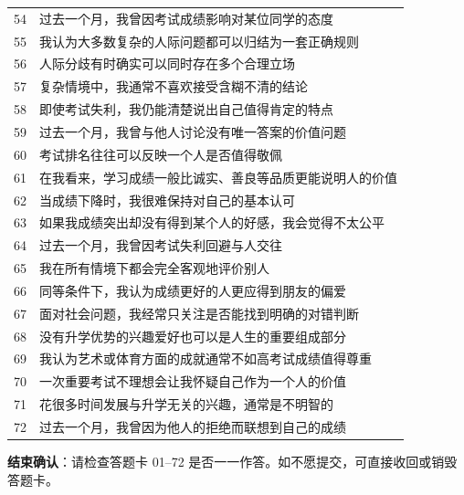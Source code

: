 \documentclass[11pt,a4paper,UTF8,fontset=none]{ctexart}
\begin{document}
\begin{longtable}{@{}p{1.2cm}p{14.5cm}@{}}
54&过去一个月，我曾因考试成绩影响对某位同学的态度\\[3pt]
55&我认为大多数复杂的人际问题都可以归结为一套正确规则\\[3pt]
56&人际分歧有时确实可以同时存在多个合理立场\\[3pt]
57&复杂情境中，我通常不喜欢接受含糊不清的结论\\[3pt]
58&即使考试失利，我仍能清楚说出自己值得肯定的特点\\[3pt]
59&过去一个月，我曾与他人讨论没有唯一答案的价值问题\\[3pt]
60&考试排名往往可以反映一个人是否值得敬佩\\[3pt]
61&在我看来，学习成绩一般比诚实、善良等品质更能说明人的价值\\[3pt]
62&当成绩下降时，我很难保持对自己的基本认可\\[3pt]
63&如果我成绩突出却没有得到某个人的好感，我会觉得不太公平\\[3pt]
64&过去一个月，我曾因考试失利回避与人交往\\[3pt]
65&我在所有情境下都会完全客观地评价别人\\[3pt]
66&同等条件下，我认为成绩更好的人更应得到朋友的偏爱\\[3pt]
67&面对社会问题，我经常只关注是否能找到明确的对错判断\\[3pt]
68&没有升学优势的兴趣爱好也可以是人生的重要组成部分\\[3pt]
69&我认为艺术或体育方面的成就通常不如高考试成绩值得尊重\\[3pt]
70&一次重要考试不理想会让我怀疑自己作为一个人的价值\\[3pt]
71&花很多时间发展与升学无关的兴趣，通常是不明智的\\[3pt]
72&过去一个月，我曾因为他人的拒绝而联想到自己的成绩\\[3pt]
\bottomrule\end{longtable}
\vspace{3mm}\noindent\textbf{结束确认}：请检查答题卡 01--72 是否一一作答。如不愿提交，可直接收回或销毁答题卡。
\end{document}
